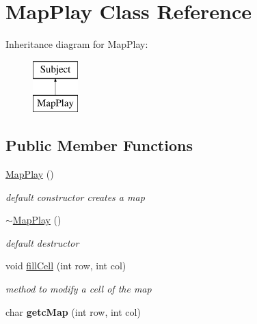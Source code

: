 \hypertarget{class_map_play}{}\section{Map\+Play Class Reference}
\label{class_map_play}
Inheritance diagram for Map\+Play\+:\begin{figure}[H]
\begin{center}
\leavevmode
\includegraphics[height=2.000000cm]{class_map_play}
\end{center}
\end{figure}
\subsection*{Public Member Functions}
\begin{DoxyCompactItemize}
\item 
\hypertarget{class_map_play_a8028a7859349b4736abc9d3488e872ba}{}\label{class_map_play_a8028a7859349b4736abc9d3488e872ba} 
\hyperlink{class_map_play_a8028a7859349b4736abc9d3488e872ba}{Map\+Play} ()
\begin{DoxyCompactList}\small\item\em default constructor creates a map \end{DoxyCompactList}\item 
\hypertarget{class_map_play_ab24335073097f350d1890ad21b634da0}{}\label{class_map_play_ab24335073097f350d1890ad21b634da0} 
\hyperlink{class_map_play_ab24335073097f350d1890ad21b634da0}{$\sim$\+Map\+Play} ()
\begin{DoxyCompactList}\small\item\em default destructor \end{DoxyCompactList}\item 
void \hyperlink{class_map_play_a1f9b85a315373ef67846db347f6d4adc}{fill\+Cell} (int row, int col)
\begin{DoxyCompactList}\small\item\em method to modify a cell of the map \end{DoxyCompactList}\item 
\hypertarget{class_map_play_ad967902d8ff8cd582f81808acca41003}{}\label{class_map_play_ad967902d8ff8cd582f81808acca41003} 
char {\bfseries getc\+Map} (int row, int col)
\end{DoxyCompactItemize}


